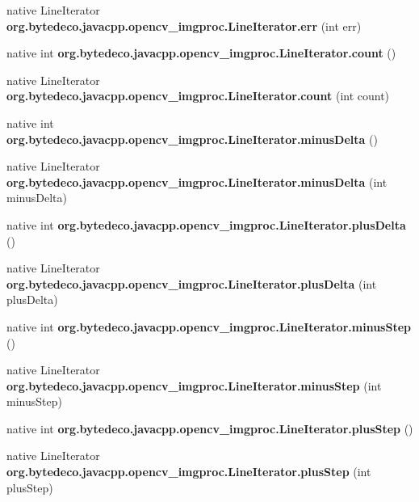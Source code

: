 \begin{DoxyCompactItemize}
native Line\+Iterator {\bfseries org.\+bytedeco.\+javacpp.\+opencv\+\_\+imgproc.\+Line\+Iterator.\+err} (int err)
\item 
\mbox{\label{group__imgproc_ga02a146e333c11cdc62f4e43abb88a287}} 
native int {\bfseries org.\+bytedeco.\+javacpp.\+opencv\+\_\+imgproc.\+Line\+Iterator.\+count} ()
\item 
\mbox{\label{group__imgproc_gae7f92c5f421498ac0cdaa980f4efe18d}} 
native Line\+Iterator {\bfseries org.\+bytedeco.\+javacpp.\+opencv\+\_\+imgproc.\+Line\+Iterator.\+count} (int count)
\item 
\mbox{\label{group__imgproc_ga1110a1a25f654d252b9c20a8ac442f0e}} 
native int {\bfseries org.\+bytedeco.\+javacpp.\+opencv\+\_\+imgproc.\+Line\+Iterator.\+minus\+Delta} ()
\item 
\mbox{\label{group__imgproc_ga9d494e72b584598875663faf2a797703}} 
native Line\+Iterator {\bfseries org.\+bytedeco.\+javacpp.\+opencv\+\_\+imgproc.\+Line\+Iterator.\+minus\+Delta} (int minus\+Delta)
\item 
\mbox{\label{group__imgproc_gaf0414d4bebd834879ca2e0c843cd2230}} 
native int {\bfseries org.\+bytedeco.\+javacpp.\+opencv\+\_\+imgproc.\+Line\+Iterator.\+plus\+Delta} ()
\item 
\mbox{\label{group__imgproc_ga7b49feee4b3741bfe2faebceeecc6b99}} 
native Line\+Iterator {\bfseries org.\+bytedeco.\+javacpp.\+opencv\+\_\+imgproc.\+Line\+Iterator.\+plus\+Delta} (int plus\+Delta)
\item 
\mbox{\label{group__imgproc_ga85b6ae67531003dfc1763f1500a74212}} 
native int {\bfseries org.\+bytedeco.\+javacpp.\+opencv\+\_\+imgproc.\+Line\+Iterator.\+minus\+Step} ()
\item 
\mbox{\label{group__imgproc_gae7a89b2048d1e3e1b3cd039f8f8c090e}} 
native Line\+Iterator {\bfseries org.\+bytedeco.\+javacpp.\+opencv\+\_\+imgproc.\+Line\+Iterator.\+minus\+Step} (int minus\+Step)
\item 
\mbox{\label{group__imgproc_ga88130dcb76e1f669323205e41580225c}} 
native int {\bfseries org.\+bytedeco.\+javacpp.\+opencv\+\_\+imgproc.\+Line\+Iterator.\+plus\+Step} ()
\item 
\mbox{\label{group__imgproc_gab9e2be0994d1d5d48935729096f7cc45}} 
native Line\+Iterator {\bfseries org.\+bytedeco.\+javacpp.\+opencv\+\_\+imgproc.\+Line\+Iterator.\+plus\+Step} (int plus\+Step)
\end{DoxyCompactItemize}
